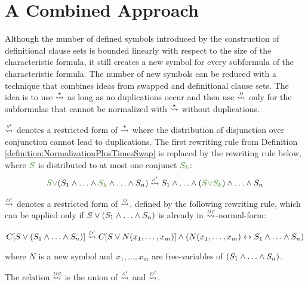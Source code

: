 \section{A Combined Approach}
\label{sec:Combination}

Although the number of defined symbols introduced by the construction of
definitional clause sets is bounded linearly with respect to the size of the
characteristic formula, it still creates a new symbol for every subformula of
the characteristic formula. The number of new symbols can be reduced with a
technique that combines ideas from swapped and definitional clause sets. The
idea is to use $\stackrel{\star}{\leadsto}$ as long as no duplications occur and
then use $\normalizePlusTimesD$ only for the subformulas that cannot be
normalized with $\stackrel{\star}{\leadsto}$ without duplications.


\begin{definition}[$\normalizePlusTimesSD$]
\label{definition:NormalizationPlusTimesDefinitionalSwap}
$\normalizePlusTimesSDs$ denotes a restricted form of $\stackrel{\star}{\leadsto}$ where the distribution of disjunction over conjunction cannot lead to duplications. The first rewriting rule from Definition \ref{definition:NormalizationPlusTimesSwap} is replaced by the rewriting rule below, where $\hF{S}$ is distributed to at most one conjunct $\hF{S_k}$:
$$
\hF{S} \hF{\structtimes} (S_1 \structplus \ldots \structplus \hF{S_k} \structplus \ldots \structplus S_n) \normalizePlusTimesSDs  S_1 \structplus \ldots \structplus (\hF{S} \hF{\structtimes} \hF{S_{k}}) \structplus \ldots \structplus S_n
$$

\noindent
$\normalizePlusTimesSDd$ denotes a restricted form of $\normalizePlusTimesD$, defined by the following rewriting rule, which can be applied only if $S \vee (S_1 \wedge \ldots \wedge S_n)$ is already in $\normalizePlusTimesSD$-normal-form:
\begin{small}
$$
C[S \vee (S_1 \structplus \ldots \structplus S_n)]   
\normalizePlusTimesSDd 
C[S \vee N(x_1,\ldots, x_m)] \structplus (N(x_1,\ldots, x_m) \biimp S_1 \structplus \ldots \structplus S_n)
$$
\end{small}
where $N$ is a new symbol and $x_1, \ldots, x_m$ are free-variables of $(S_1 \wedge \ldots \wedge S_n)$.

\medskip
\noindent
The relation $\normalizePlusTimesSD$ is the union of $\normalizePlusTimesSDs$ and $\normalizePlusTimesSDd$.
\end{definition}

